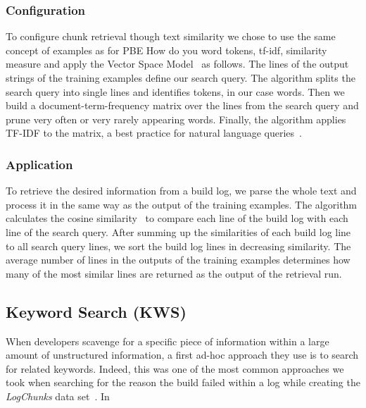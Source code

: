 \subsubsection{Configuration}
To configure chunk retrieval though text similarity we chose to use
the same concept of examples as for PBE
How do you
word tokens, tf-idf, similarity measure
and apply the Vector Space Model~\cite{schutze2008introduction}
as follows.
The
lines of the output strings of the training examples define our search
query.
The algorithm splits the search query into single lines and
identifies tokens, in our case words.
Then we build a
document-term-frequency matrix over the lines from the search query
and prune very often or very rarely appearing words.
Finally, the
algorithm applies TF-IDF to the matrix, a best practice for natural
language queries~\cite{lee1997document}.

\subsubsection{Application}
To retrieve the desired information from a build log, we parse the
whole text and process it in the same way as the output of the
training examples.
The algorithm calculates the cosine
similarity~\cite{korenius2007principal} to compare each line of the
build log with each line of the search query.
After summing up the
similarities of each build log line to all search query lines, we sort
the build log lines in decreasing similarity.
The average number of
lines in the outputs of the training examples determines how many of
the most similar lines are returned as the output of the retrieval
run.

\subsection{Keyword Search (KWS)}
\label{sec:expl-skws}
When developers scavenge for a specific piece of information within a
large amount of unstructured information, a first ad-hoc approach they
use is to search for related keywords.
Indeed, this was one of the
most common approaches we took when searching for the reason the build
failed within a log while creating the \emph{LogChunks} data
set~\cite{brandt2020logchunks}.
In

